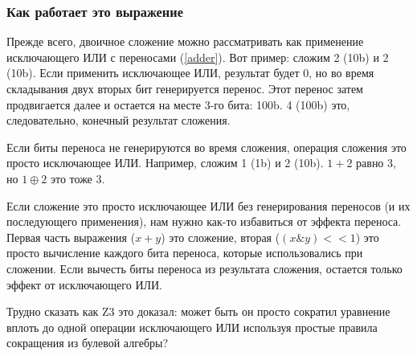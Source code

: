 \subsubsection{Как работает это выражение}

Прежде всего, двоичное сложение можно рассматривать как применение исключающего ИЛИ с переносами (\ref{adder}).
Вот пример: сложим 2 (10b) и 2 (10b).
Если применить исключающее ИЛИ, результат будет 0, но во время складывания двух вторых бит генерируется перенос.
Этот перенос затем продвигается далее и остается на месте 3-го бита: 100b.
4 (100b) это, следовательно, конечный результат сложения.

Если биты переноса не генерируются во время сложения, операция сложения это просто исключающее ИЛИ.
Например, сложим 1 (1b) и 2 (10b). $1 + 2$ равно 3, но $1 \oplus 2$ это тоже 3.

Если сложение это просто исключающее ИЛИ без генерирования переносов (и их последующего применения), нам нужно
как-то избавиться от эффекта переноса.
Первая часть выражения ($x + y$) это сложение, вторая ($(x \& y)<<1$) это просто вычисление каждого бита переноса,
которые использовались при сложении.
Если вычесть биты переноса из результата сложения, остается только эффект от исключающего ИЛИ.

Трудно сказать как Z3 это доказал:
может быть он просто сократил уравнение вплоть до одной операции исключающего ИЛИ используя 
простые правила сокращения из булевой алгебры?

